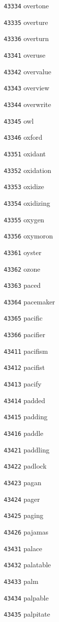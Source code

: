 \documentclass[twoside,11pt]{article}
\begin{document}
\begin{multicols}{5}
\begin{enumerate}
\item[\texttt{43334}] overtone
\item[\texttt{43335}] overture
\item[\texttt{43336}] overturn
\item[\texttt{43341}] overuse
\item[\texttt{43342}] overvalue
\item[\texttt{43343}] overview
\item[\texttt{43344}] overwrite
\item[\texttt{43345}] owl
\item[\texttt{43346}] oxford
\item[\texttt{43351}] oxidant
\item[\texttt{43352}] oxidation
\item[\texttt{43353}] oxidize
\item[\texttt{43354}] oxidizing
\item[\texttt{43355}] oxygen
\item[\texttt{43356}] oxymoron
\item[\texttt{43361}] oyster
\item[\texttt{43362}] ozone
\item[\texttt{43363}] paced
\item[\texttt{43364}] pacemaker
\item[\texttt{43365}] pacific
\item[\texttt{43366}] pacifier
\item[\texttt{43411}] pacifism
\item[\texttt{43412}] pacifist
\item[\texttt{43413}] pacify
\item[\texttt{43414}] padded
\item[\texttt{43415}] padding
\item[\texttt{43416}] paddle
\item[\texttt{43421}] paddling
\item[\texttt{43422}] padlock
\item[\texttt{43423}] pagan
\item[\texttt{43424}] pager
\item[\texttt{43425}] paging
\item[\texttt{43426}] pajamas
\item[\texttt{43431}] palace
\item[\texttt{43432}] palatable
\item[\texttt{43433}] palm
\item[\texttt{43434}] palpable
\item[\texttt{43435}] palpitate

\end{enumerate}
\end{multicols}
\end{document}
